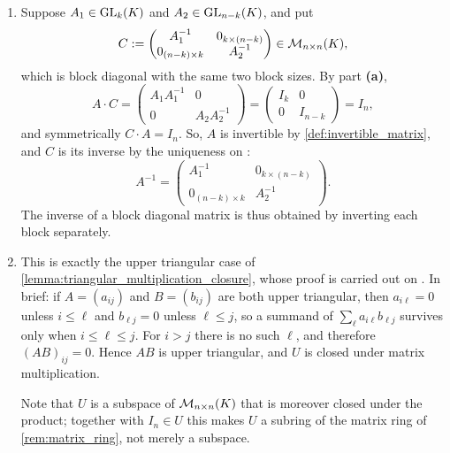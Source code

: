 \begin{exercisesolution}
\begin{enumerate}[label=\textbf{(\alph*)}]
    \item Suppose $A_1 \in \operatorname{GL}_k(K)$ and $A_2 \in \operatorname{GL}_{n-k}(K)$, and put
    \[
        C := \begin{pmatrix} A_1^{-1} & 0_{k \times (n-k)} \\ 0_{(n-k) \times k} & A_2^{-1} \end{pmatrix} \in \mathcal{M}_{n \times n}(K),
    \]
    which is block diagonal with the same two block sizes. By part \textbf{(a)},
    \[
        A \cdot C = \begin{pmatrix} A_1 A_1^{-1} & 0 \\ 0 & A_2 A_2^{-1} \end{pmatrix} = \begin{pmatrix} I_k & 0 \\ 0 & I_{n-k} \end{pmatrix} = I_n,
    \]
    and symmetrically $C \cdot A = I_n$. So, $A$ is invertible by \cref{def:invertible_matrix}, and $C$ is its inverse by the uniqueness on :
    \[
        A^{-1} = \begin{pmatrix} A_1^{-1} & 0_{k \times (n-k)} \\ 0_{(n-k) \times k} & A_2^{-1} \end{pmatrix}.
    \]
    The inverse of a block diagonal matrix is thus obtained by inverting each block separately.

    \item This is exactly the upper triangular case of \cref{lemma:triangular_multiplication_closure}, whose proof is carried out on . In brief: if $A = (a_{ij})$ and $B = (b_{ij})$ are both upper triangular, then $a_{i\ell} = 0$ unless $i \le \ell$ and $b_{\ell j} = 0$ unless $\ell \le j$, so a summand of $\sum_{\ell} a_{i\ell} b_{\ell j}$ survives only when $i \le \ell \le j$. For $i > j$ there is no such $\ell$, and therefore $(AB)_{ij} = 0$. Hence $AB$ is upper triangular, and $U$ is closed under matrix multiplication.

    Note that $U$ is a subspace of $\mathcal{M}_{n \times n}(K)$ that is moreover closed under the product; together with $I_n \in U$ this makes $U$ a subring of the matrix ring of \cref{rem:matrix_ring}, not merely a subspace.
\end{enumerate}
\end{exercisesolution}

